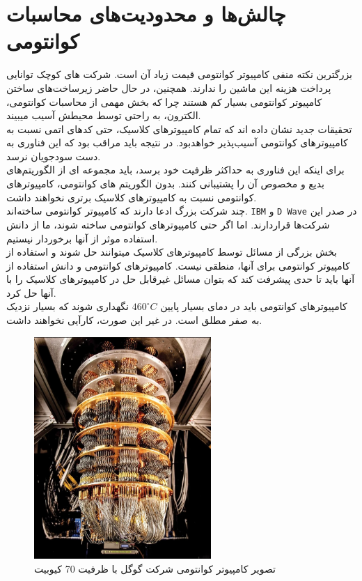 \chapter{چالش‌ها و محدودیت‌های محاسبات کوانتومی}
بزرگترین نکته منفی کامپیوتر کوانتومی قیمت زیاد آن است. شرکت های کوچک توانایی پرداخت هزینه این ماشین را ندارند. همچنین، در حال حاضر زیرساخت‌های ساختن کامپیوتر کوانتومی بسیار کم هستند چرا که بخش مهمی از محاسبات کوانتومی، الکترون، به راحتی توسط محیطش آسیب میبیند.
\\
تحقیقات جدید نشان داده اند که تمام کامپیوترهای کلاسیک، حتی کدهای اتمی نسبت به کامپیوترهای کوانتومی آسیب‌پذیر خواهدبود. در نتیجه باید مراقب بود که این فناوری به دست سودجویان نرسد.
\\
برای اینکه این فناوری به حداکثر ظرفیت خود برسد، باید مجموعه ای از الگوریتم‌های بدیع و مخصوص آن را پشتیبانی کنند. بدون الگوریتم های کوانتومی، کامپیوترهای کوانتومی نسبت به کامپیوترهای کلاسیک برتری‌ نخواهند داشت.
\\
چند شرکت بزرگ ادعا دارند که کامپیوتر کوانتومی ساخته‌اند. 
\verb;IBM;
و 
\verb;D Wave;
در صدر این شرکت‌ها قراردارند. اما اگر حتی کامپیوترهای کوانتومی ساخته شوند، ما از دانش استفاده موثر از آنها برخوردار نیستیم. 
\\
بخش بزرگی از مسائل توسط کامپیوترهای کلاسیک میتوانند حل شوند و استفاده از کامپیوتر کوانتومی برای آنها، منطقی نیست. کامپیوترهای کوانتومی و دانش استفاده از آنها باید تا حدی پیشرفت کند که بتوان مسائل غیرقابل حل در کامپیوترهای کلاسیک را با آنها حل کرد.
\\
کامپیوترهای کوانتومی باید در دمای بسیار پایین $460^{\circ }C$ نگهداری شوند که بسیار نزدیک به صفر مطلق است. در غیر این صورت، کارآیی نخواهند داشت.
\cite{singhbook}
\begin{figure}
\centerline{\includegraphics[width=0.6\textwidth]{computer.jpeg}}
\caption{تصویر کامپیوتر کوانتومی شرکت گوگل با ظرفیت 70 کیوبیت}
\end{figure}